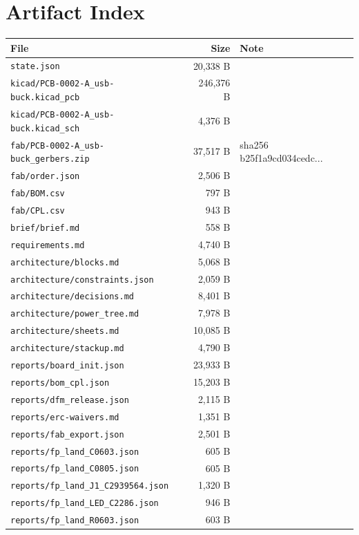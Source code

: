 \documentclass[11pt,a4paper]{article}
\begin{document}
\section{Artifact Index}
{\small
\begin{longtable}{p{9cm}rp{4cm}}
\toprule
\textbf{File} & \textbf{Size} & \textbf{Note} \\
\midrule
\endhead
\texttt{state.json} & 20,338 B &  \\
\texttt{kicad/PCB-0002-A\_usb-buck.kicad\_pcb} & 246,376 B &  \\
\texttt{kicad/PCB-0002-A\_usb-buck.kicad\_sch} & 4,376 B &  \\
\texttt{fab/PCB-0002-A\_usb-buck\_gerbers.zip} & 37,517 B & sha256 b25f1a9cd034cedc... \\
\texttt{fab/order.json} & 2,506 B &  \\
\texttt{fab/BOM.csv} & 797 B &  \\
\texttt{fab/CPL.csv} & 943 B &  \\
\texttt{brief/brief.md} & 558 B &  \\
\texttt{requirements.md} & 4,740 B &  \\
\texttt{architecture/blocks.md} & 5,068 B &  \\
\texttt{architecture/constraints.json} & 2,059 B &  \\
\texttt{architecture/decisions.md} & 8,401 B &  \\
\texttt{architecture/power\_tree.md} & 7,978 B &  \\
\texttt{architecture/sheets.md} & 10,085 B &  \\
\texttt{architecture/stackup.md} & 4,790 B &  \\
\texttt{reports/board\_init.json} & 23,933 B &  \\
\texttt{reports/bom\_cpl.json} & 15,203 B &  \\
\texttt{reports/dfm\_release.json} & 2,115 B &  \\
\texttt{reports/erc-waivers.md} & 1,351 B &  \\
\texttt{reports/fab\_export.json} & 2,501 B &  \\
\texttt{reports/fp\_land\_C0603.json} & 605 B &  \\
\texttt{reports/fp\_land\_C0805.json} & 605 B &  \\
\texttt{reports/fp\_land\_J1\_C2939564.json} & 1,320 B &  \\
\texttt{reports/fp\_land\_LED\_C2286.json} & 946 B &  \\
\texttt{reports/fp\_land\_R0603.json} & 603 B &  \\

\end{longtable}}
\end{document}

